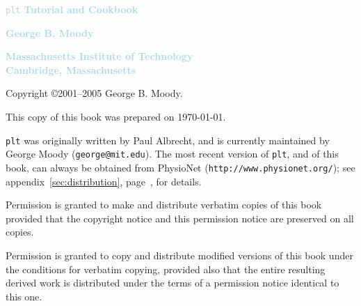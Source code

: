 \documentclass{book}
\begin{document}
\begin{titlepage}
\noindent

\vspace*{\fill}

\noindent
\textcolor{lightblue}{
\Huge{
{\tt plt} \textbf{Tutorial and Cookbook}}}
\vspace{2cm}

\Large{
\noindent
\textcolor{lightblue}{
\textbf{George B. Moody}}

\noindent
\textcolor{lightblue}{
\textbf{Massachusetts Institute of Technology\\
Cambridge, Massachusetts}
}}

\vspace{2cm}

\noindent
{}
\vspace*{4cm}
\end{titlepage}
\thispagestyle{empty}

\vspace*{\fill}

\noindent
Copyright \copyright 2001--2005 George B. Moody.

\vspace{2cm}

\noindent
This copy of this book was prepared on \today{}.

\vspace{3mm}

\noindent
{\tt plt} was originally written by Paul Albrecht, and is currently
maintained by George Moody ({\tt george@mit.edu}).  The most recent
version of {\tt plt}, and of this book, can always be obtained from
PhysioNet ({\tt http://www.physionet.org/}); see
appendix~\ref{sec:distribution}, page~\pageref{sec:distribution}, for
details.

\vspace{3mm}

\noindent
Permission is granted to make and distribute verbatim copies of this
book provided that the copyright notice and this permission notice are
preserved on all copies.

\vspace{3mm}

\noindent
Permission is granted to copy and distribute modified versions of this
book under the conditions for verbatim copying, provided also that the
entire resulting derived work is distributed under the terms of a permission
notice identical to this one.
\end{document}
